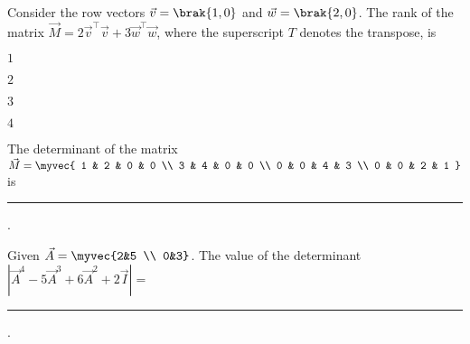\item Consider the row vectors $\vec{v} =\brak{1,0}$ and $\vec{w} =\brak{2,0}$. The rank of the matrix $\vec{M} = 2\vec{v}^{\top}\vec{v} + 3\vec{w}^{\top} \vec{w}$, where the superscript $T$ denotes the transpose, is \par \hfill{}
\begin{enumerate}
\begin{multicols}{4}
  \item $1$
  \item $2$
  \item $3$
  \item $4$
\end{multicols}
\end{enumerate}
\item The determinant of the matrix 
$\vec{M} = \myvec{
1 & 2 & 0 & 0 \\
3 & 4 & 0 & 0 \\
0 & 0 & 4 & 3 \\
0 & 0 & 2 & 1
}$
is \rule{1.5cm}{0.4pt}. \hfill{}
\item Given $\vec{A} = \myvec{2&5 \\ 0&3}$.  
The value of the determinant $|\vec{A}^4 -5\vec{A}^3 +6\vec{A}^2 +2\vec{I}| =$ \rule{1.5cm}{0.4pt}.  

\hfill{}
